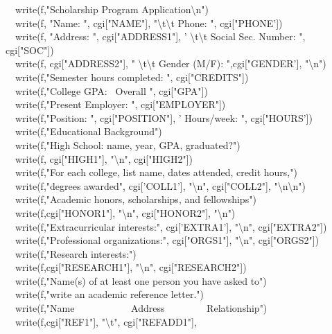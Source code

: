 {{\ \ write(f,"Scholarship Program
Application{\textbackslash}n") \\
\ \ write(f, "Name: ",
cgi["NAME"],
"{\textbackslash}t{\textbackslash}t Phone:
", cgi["PHONE']) \\
\ \ write(f, "Address: ",
cgi["ADDRESS1"], '
{\textbackslash}t{\textbackslash}t Social Sec. Number: ",
cgi["SOC"]) \\
\ \ write(f, cgi["ADDRESS2"],
" {\textbackslash}t{\textbackslash}t Gender (M/F):
",cgi["GENDER'],
"{\textbackslash}n") \\
\ \ write(f,"Semester hours completed: ",
cgi["CREDITS"]) \\
\ \ write(f,"College GPA: \ Overall ",
cgi["GPA"]) \\
\ \ write(f,"Present Employer: ",
cgi["EMPLOYER"]) \\
\ \ write(f,"Position: ",
cgi["POSITION"], '
Hours/week: ", cgi["HOURS']) \\
\ \ write(f,"Educational Background") \\
\ \ write(f,"High School: name, year, GPA,
		graduated?") \\
\ \ write(f, cgi["HIGH1"],
"{\textbackslash}n",
cgi["HIGH2"]) \\
\ \ write(f,"For each college, list name, dates attended,
credit hours,") \\
\ \ write(f,"degrees awarded", cgi['COLL1'],
"{\textbackslash}n",
cgi["COLL2"],
"{\textbackslash}n{\textbackslash}n") \\
\ \ write(f,"Academic honors, scholarships, and
fellowships") \\
\ \ write(f,cgi["HONOR1"],
"{\textbackslash}n",
cgi["HONOR2"],
"{\textbackslash}n") \\
\ \ write(f,"Extracurricular interests:", cgi['EXTRA1'],
"{\textbackslash}n",
cgi["EXTRA2"]) \\
\ \ write(f,"Professional organizations:",
cgi["ORGS1"],
"{\textbackslash}n",
cgi["ORGS2"]) \\
\ \ write(f,"Research interests:") \\
\ \ write(f,cgi["RESEARCH1"],
"{\textbackslash}n",
cgi["RESEARCH2"]) \\
\ \ write(f,"Name(s) of at least one person you have asked
to") \\
\ \ write(f,"write an academic reference
letter.") \\
\ \ write(f,"Name \ \ \ \ \ \ \ \ \ \ \ Address
\ \ \ \ \ \ \ \ Relationship") \\
\ \ write(f,cgi["REF1"],
"{\textbackslash}t",
cgi["REFADD1"],
}}
